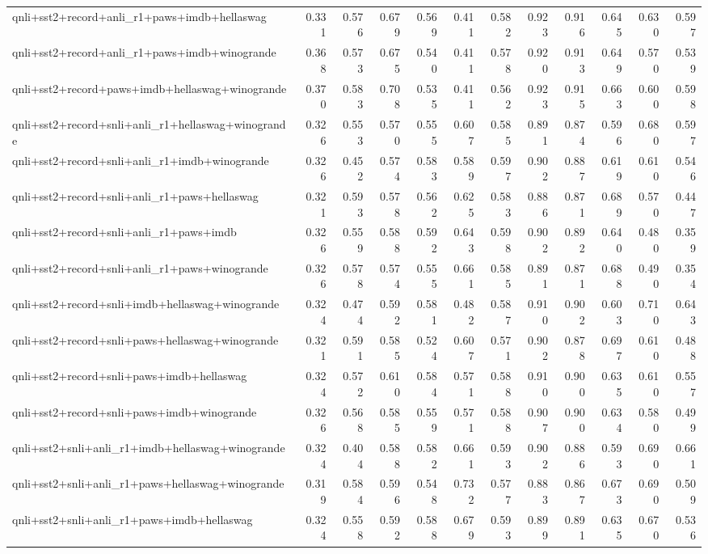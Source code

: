 \begin{table}[t]
\begin{tabular}{lrrrrrrrrrrr}
    qnli+sst2+record+anli\_r1+paws+imdb+hellaswag & 0.331 & 0.576 & 0.679 & 0.569 & 0.411 & 0.582 & 0.923 & 0.916 & 0.645 & 0.630 & 0.597 \\
    qnli+sst2+record+anli\_r1+paws+imdb+winogrande & 0.368 & 0.573 & 0.675 & 0.540 & 0.411 & 0.578 & 0.920 & 0.913 & 0.649 & 0.570 & 0.539 \\
    qnli+sst2+record+paws+imdb+hellaswag+winogrande & 0.370 & 0.583 & 0.708 & 0.535 & 0.411 & 0.562 & 0.923 & 0.915 & 0.663 & 0.600 & 0.598 \\
    qnli+sst2+record+snli+anli\_r1+hellaswag+winogrande & 0.326 & 0.553 & 0.570 & 0.555 & 0.607 & 0.585 & 0.891 & 0.874 & 0.596 & 0.680 & 0.597 \\
    qnli+sst2+record+snli+anli\_r1+imdb+winogrande & 0.326 & 0.452 & 0.574 & 0.583 & 0.589 & 0.597 & 0.902 & 0.887 & 0.619 & 0.610 & 0.546 \\
    qnli+sst2+record+snli+anli\_r1+paws+hellaswag & 0.321 & 0.593 & 0.578 & 0.562 & 0.625 & 0.583 & 0.886 & 0.871 & 0.689 & 0.570 & 0.447 \\
    qnli+sst2+record+snli+anli\_r1+paws+imdb & 0.326 & 0.559 & 0.588 & 0.592 & 0.643 & 0.598 & 0.902 & 0.892 & 0.640 & 0.480 & 0.359 \\
    qnli+sst2+record+snli+anli\_r1+paws+winogrande & 0.326 & 0.578 & 0.574 & 0.555 & 0.661 & 0.585 & 0.891 & 0.871 & 0.688 & 0.490 & 0.354 \\
    qnli+sst2+record+snli+imdb+hellaswag+winogrande & 0.324 & 0.474 & 0.592 & 0.581 & 0.482 & 0.587 & 0.910 & 0.902 & 0.603 & 0.710 & 0.643 \\
    qnli+sst2+record+snli+paws+hellaswag+winogrande & 0.321 & 0.591 & 0.585 & 0.524 & 0.607 & 0.571 & 0.902 & 0.878 & 0.697 & 0.610 & 0.488 \\
    qnli+sst2+record+snli+paws+imdb+hellaswag & 0.324 & 0.572 & 0.610 & 0.584 & 0.571 & 0.588 & 0.910 & 0.900 & 0.635 & 0.610 & 0.557 \\
    qnli+sst2+record+snli+paws+imdb+winogrande & 0.326 & 0.568 & 0.585 & 0.559 & 0.571 & 0.588 & 0.907 & 0.900 & 0.634 & 0.580 & 0.499 \\
    qnli+sst2+snli+anli\_r1+imdb+hellaswag+winogrande & 0.324 & 0.404 & 0.588 & 0.582 & 0.661 & 0.593 & 0.902 & 0.886 & 0.593 & 0.690 & 0.661 \\
    qnli+sst2+snli+anli\_r1+paws+hellaswag+winogrande & 0.319 & 0.584 & 0.596 & 0.548 & 0.732 & 0.577 & 0.883 & 0.867 & 0.673 & 0.690 & 0.509 \\
    qnli+sst2+snli+anli\_r1+paws+imdb+hellaswag & 0.324 & 0.558 & 0.592 & 0.588 & 0.679 & 0.593 & 0.899 & 0.891 & 0.635 & 0.670 & 0.536 \\

\end{tabular}
\end{table}
